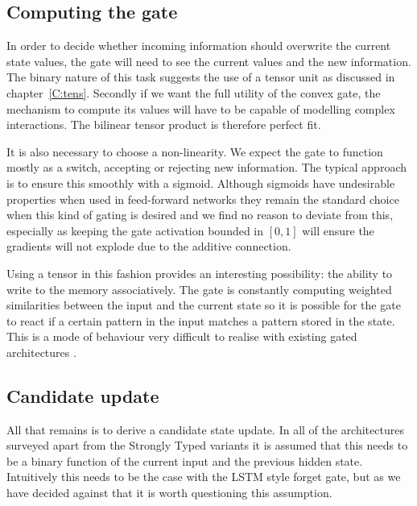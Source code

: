 \subsection{Computing the gate}
In order to decide whether incoming information should
overwrite the current state values, the gate will need to see the current values and the new information.
The binary nature of this task suggests
the use of a tensor unit as discussed in chapter~\ref{C:tens}. Secondly if we want the full utility of
the convex gate, the mechanism to compute its values will have to be capable of modelling complex interactions. 
The bilinear tensor product is therefore
perfect fit.

It is also necessary to choose a non-linearity. We expect the gate to function mostly as a switch,
accepting or rejecting new information. The
typical approach is to ensure this smoothly with a sigmoid. Although sigmoids have undesirable
properties when used in feed-forward networks \autocite{Glorot2010} they remain the standard choice
when this kind of gating is desired \autocite{VandenOord2016, Oord2016} and we find no reason to
deviate from this, especially as keeping the gate activation bounded in \([0,1]\) will ensure the
gradients will not explode due to the additive connection.

Using a tensor in this fashion provides an interesting possibility: the ability to write to the memory
associatively. The gate is constantly computing weighted similarities between
the input and the current state so it is possible for the gate to react if a certain pattern in the
input matches a pattern stored in the state. This is a mode of behaviour very difficult to realise
with existing gated architectures \autocite{Danihelka2016}.

\subsection{Candidate update}
All that remains is to derive a candidate state update. In all of the architectures
surveyed apart from the Strongly Typed variants \autocite{Balduzzi2016} it is assumed that this needs
to be a binary function of the current input and the previous hidden state. Intuitively this needs to
be the case with the LSTM style forget gate, but as we have decided against that it is worth questioning
this assumption.

